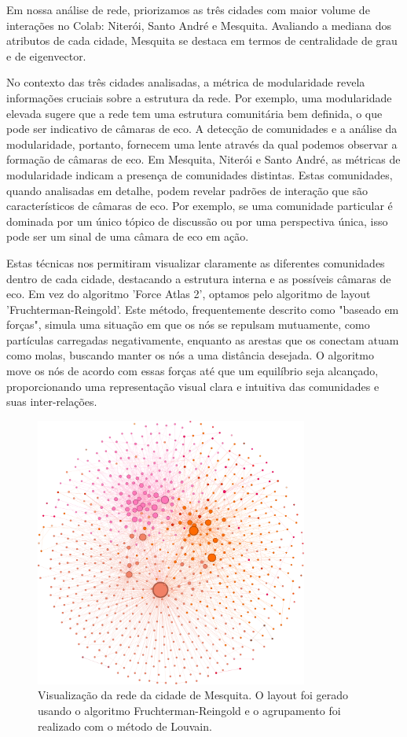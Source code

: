 Em nossa análise de rede, priorizamos as três cidades com maior volume de interações no Colab: Niterói, Santo André e Mesquita. Avaliando a mediana dos atributos de cada cidade, Mesquita se destaca em termos de centralidade de grau e de eigenvector.

No contexto das três cidades analisadas, a métrica de modularidade revela informações cruciais sobre a estrutura da rede. Por exemplo, uma modularidade elevada sugere que a rede tem uma estrutura comunitária bem definida, o que pode ser indicativo de câmaras de eco. A detecção de comunidades e a análise da modularidade, portanto, fornecem uma lente através da qual podemos observar a formação de câmaras de eco. Em Mesquita, Niterói e Santo André, as métricas de modularidade indicam a presença de comunidades distintas. Estas comunidades, quando analisadas em detalhe, podem revelar padrões de interação que são característicos de câmaras de eco. Por exemplo, se uma comunidade particular é dominada por um único tópico de discussão ou por uma perspectiva única, isso pode ser um sinal de uma câmara de eco em ação.

Estas técnicas nos permitiram visualizar claramente as diferentes comunidades dentro de cada cidade, destacando a estrutura interna e as possíveis câmaras de eco. Em vez do algoritmo 'Force Atlas 2', optamos pelo algoritmo de layout 'Fruchterman-Reingold'. Este método, frequentemente descrito como "baseado em forças", simula uma situação em que os nós se repulsam mutuamente, como partículas carregadas negativamente, enquanto as arestas que os conectam atuam como molas, buscando manter os nós a uma distância desejada. O algoritmo move os nós de acordo com essas forças até que um equilíbrio seja alcançado, proporcionando uma representação visual clara e intuitiva das comunidades e suas inter-relações.

\begin{figure}[h]
    \centering
    \includegraphics[width=0.8\textwidth]{images/graph-mesquita.png}
    \caption{Visualização da rede da cidade de Mesquita. O layout foi gerado usando o algoritmo Fruchterman-Reingold e o agrupamento foi realizado com o método de Louvain.}
    \label{fig:mesquita-graph}
	\fautor
\end{figure}

